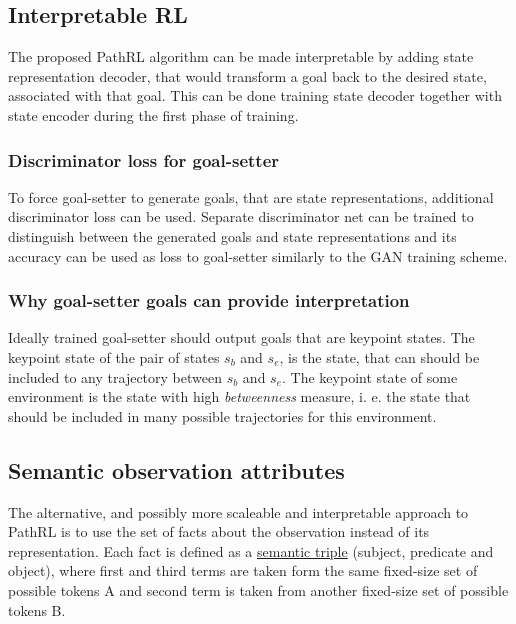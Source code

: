 \documentclass[acmsmall, nonacm]{acmart}
\begin{document}
\subsection{Interpretable RL}

The proposed PathRL algorithm can be made interpretable by adding state representation decoder, that would transform a goal back to the desired state, associated with that goal. This can be done training state decoder together with state encoder during the first phase of training.

\subsubsection{Discriminator loss for goal-setter}

To force goal-setter to generate goals, that are state representations, additional discriminator loss can be used. Separate discriminator net can be trained to distinguish between the generated goals and state representations and its accuracy can be used as loss to goal-setter similarly to the GAN training scheme.

\subsubsection{Why goal-setter goals can provide interpretation}

Ideally trained goal-setter should output goals that are keypoint states. The keypoint state of the pair of states $s_b$ and $s_e$, is the state, that can should be included to any trajectory between $s_b$ and $s_e$. The keypoint state of some environment is the state with high \emph{betweenness} measure, i. e. the state that should be included in many possible trajectories for this environment.

\subsection{Semantic observation attributes}

The alternative, and possibly more scaleable and interpretable approach to PathRL is to use the set of facts about the observation instead of its representation. Each fact is defined as a \href{https://en.wikipedia.org/wiki/Semantic_triple}{semantic triple} (subject, predicate and object), where first and third terms are taken form the same fixed-size set of possible tokens A and second term is taken from another fixed-size set of possible tokens B.
\end{document}

